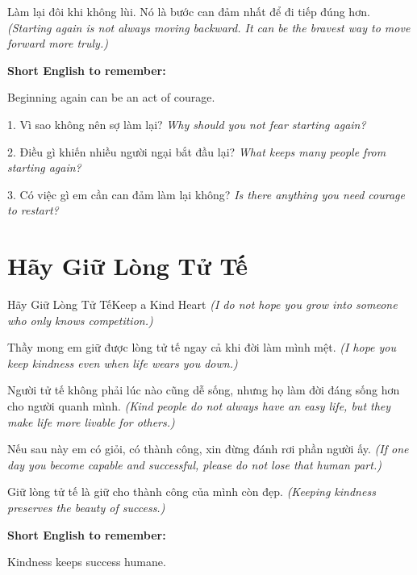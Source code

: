 \begin{baihoc}
Làm lại đôi khi không lùi. Nó là bước can đảm nhất để đi tiếp đúng hơn.
\textit{(Starting again is not always moving backward. It can be the bravest way to move forward more truly.)}
\end{baihoc}

\begin{ghinhoanh}
\textbf{Short English to remember:}

Beginning again can be an act of courage.

\end{ghinhoanh}

\begin{tuhocnhanh}
1. Vì sao không nên sợ làm lại? \textit{Why should you not fear starting again?}

2. Điều gì khiến nhiều người ngại bắt đầu lại? \textit{What keeps many people from starting again?}

3. Có việc gì em cần can đảm làm lại không? \textit{Is there anything you need courage to restart?}
\end{tuhocnhanh}
\ngancach

\section{Hãy Giữ Lòng Tử Tế}
\begin{truyen}{Hãy Giữ Lòng Tử Tế}{Keep a Kind Heart}
\textit{(I do not hope you grow into someone who only knows competition.)}

Thầy mong em giữ được lòng tử tế ngay cả khi đời làm mình mệt.
\textit{(I hope you keep kindness even when life wears you down.)}

Người tử tế không phải lúc nào cũng dễ sống, nhưng họ làm đời đáng sống hơn cho người quanh mình.
\textit{(Kind people do not always have an easy life, but they make life more livable for others.)}

Nếu sau này em có giỏi, có thành công, xin đừng đánh rơi phần người ấy.
\textit{(If one day you become capable and successful, please do not lose that human part.)}
\end{truyen}

\begin{baihoc}
Giữ lòng tử tế là giữ cho thành công của mình còn đẹp.
\textit{(Keeping kindness preserves the beauty of success.)}
\end{baihoc}

\begin{ghinhoanh}
\textbf{Short English to remember:}

Kindness keeps success humane.

\end{ghinhoanh}

